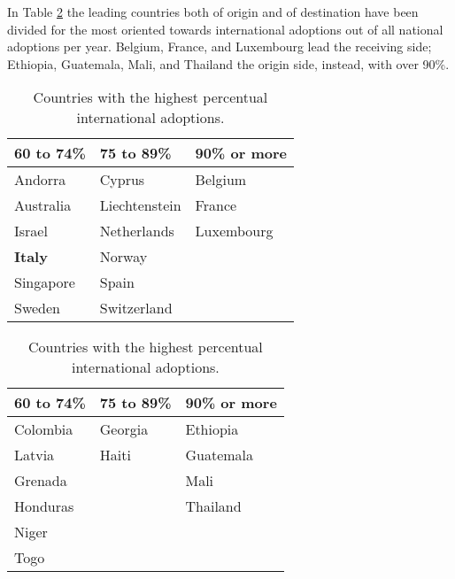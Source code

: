 
In Table \ref{tab:intadoptpercentcountries} the leading countries both of origin and of destination have been divided for the most oriented towards international adoptions out of all national adoptions per year. Belgium, France, and Luxembourg lead the receiving side; Ethiopia, Guatemala, Mali, and Thailand the origin side, instead, with over 90\%. 

\begin{table}[H]
    \begin{subtable}[h]{0.45\textwidth}
        \centering
        \begin{tabular}{l l l}
        60 to 74\% & 75 to 89\% & 90\% or more\\
        \hline
        Andorra & Cyprus & Belgium\\
        Australia & Liechtenstein & France\\
        Israel & Netherlands & Luxembourg\\
        \textcolor{BrickRed}{\textbf{Italy}} & Norway & \\
        Singapore & Spain & \\
        Sweden & Switzerland & \\
        \end{tabular}
        \caption{Receiving Countries}
        \label{tab:receivingcountries}
    \end{subtable}
    \hfill
    \begin{subtable}[h]{0.45\textwidth}
        \centering
        \begin{tabular}{l l l}
        60 to 74\% & 75 to 89\% & 90\% or more\\
        \hline
        Colombia & Georgia & Ethiopia\\
        Latvia & Haiti & Guatemala\\
        Grenada &  & Mali\\
        Honduras &  & Thailand\\
        Niger &  & \\
        Togo &  & \\
        \end{tabular}
        \caption{Countries of origin}
        \label{tab:countriesoforigin}
    \end{subtable}
    \caption{Countries with the highest percentual international adoptions.}
    \label{tab:intadoptpercentcountries}
\end{table}

